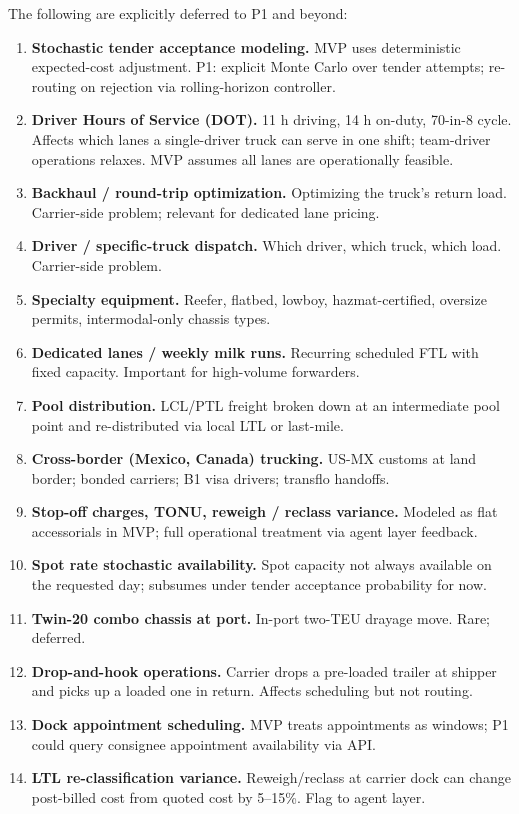 \documentclass[11pt,a4paper]{article}
\theoremstyle{definition}
\begin{document}
The following are explicitly deferred to P1 and beyond:

\begin{enumerate}[noitemsep]
  \item \textbf{Stochastic tender acceptance modeling.} MVP uses deterministic expected-cost
        adjustment. P1: explicit Monte Carlo over tender attempts; re-routing on rejection
        via rolling-horizon controller.
  \item \textbf{Driver Hours of Service (DOT).} 11 h driving, 14 h on-duty, 70-in-8 cycle.
        Affects which lanes a single-driver truck can serve in one shift; team-driver
        operations relaxes. MVP assumes all lanes are operationally feasible.
  \item \textbf{Backhaul / round-trip optimization.} Optimizing the truck's return load.
        Carrier-side problem; relevant for dedicated lane pricing.
  \item \textbf{Driver / specific-truck dispatch.} Which driver, which truck, which load.
        Carrier-side problem.
  \item \textbf{Specialty equipment.} Reefer, flatbed, lowboy, hazmat-certified, oversize
        permits, intermodal-only chassis types.
  \item \textbf{Dedicated lanes / weekly milk runs.} Recurring scheduled FTL with fixed
        capacity. Important for high-volume forwarders.
  \item \textbf{Pool distribution.} LCL/PTL freight broken down at an intermediate pool
        point and re-distributed via local LTL or last-mile.
  \item \textbf{Cross-border (Mexico, Canada) trucking.} US-MX customs at land border;
        bonded carriers; B1 visa drivers; transflo handoffs.
  \item \textbf{Stop-off charges, TONU, reweigh / reclass variance.} Modeled as flat
        accessorials in MVP; full operational treatment via agent layer feedback.
  \item \textbf{Spot rate stochastic availability.} Spot capacity not always available
        on the requested day; subsumes under tender acceptance probability for now.
  \item \textbf{Twin-20 combo chassis at port.} In-port two-TEU drayage move. Rare;
        deferred.
  \item \textbf{Drop-and-hook operations.} Carrier drops a pre-loaded trailer at shipper
        and picks up a loaded one in return. Affects scheduling but not routing.
  \item \textbf{Dock appointment scheduling.} MVP treats appointments as windows; P1
        could query consignee appointment availability via API.
  \item \textbf{LTL re-classification variance.} Reweigh/reclass at carrier dock can
        change post-billed cost from quoted cost by 5--15\%. Flag to agent layer.
\end{enumerate}
\end{document}
